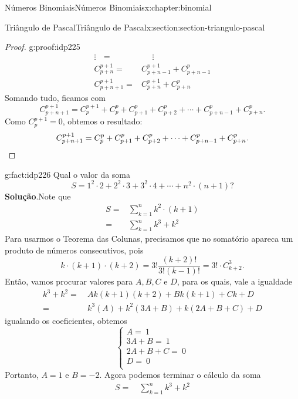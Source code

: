 \documentclass[oneside,10pt,]{book}
\newcommand{\blocktitlefont}{\relax}
\newcommand{\qedhere}{\relax}
\numberwithin{equation}{section}
\newcommand{\amp}{&}
\begin{document}
\begin{chapterptx}{Números Binomiais}{}{Números Binomiais}{}{}{x:chapter:binomial}
\begin{sectionptx}{Triângulo de Pascal}{}{Triângulo de Pascal}{}{}{x:section:section-triangulo-pascal}
\begin{proof}{}{g:proof:idp225}
\begin{align*}
\vdots ~~~ = \amp ~~~~~~ \vdots   \\
C_{p+n}^{p+1} = \amp C_{p+n-1}^{p+1} + C_{p+n-1}^p  \\
C_{p+n+1}^{p+1} = \amp C_{p+n}^{p+1} + C_{p+n}^p  
\end{align*}
Somando tudo, ficamos com%
\begin{equation*}
C_{p+n+1}^{p+1} = C_p^{p+1} + C_p^p + C_{p+1}^p + C_{p+2}^p +\cdots + C_{p+n-1}^p + C_{p+n}^p.
\end{equation*}
Como \(C_p^{p+1} = 0\), obtemos o resultado:%
\begin{equation*}
C_{p+n+1}^{p+1} = C_p^p + C_{p+1}^p + C_{p+2}^p +\cdots + C_{p+n-1}^p + C_{p+n}^p.\qedhere
\end{equation*}
\end{proof}
\begin{fact}{}{}{g:fact:idp226}%
Qual o valor da soma%
\begin{equation*}
S = 1^2\cdot2 + 2^2\cdot3+  3^2\cdot4+\cdots+n^2\cdot(n+1)? 
\end{equation*}
%
\textbf{\blocktitlefont Solução}.\quad{}Note que%
\begin{align*}
S = \amp \sum_{k=1}^{n} k^2\cdot (k+1)  \\
= \amp \sum_{k=1}^{n} k^3+k^2  
\end{align*}
Para usarmos o Teorema das Colunas, precisamos que no somatório apareca um produto de números consecutivos, pois%
\begin{equation*}
k\cdot(k+1)\cdot(k+2) = 3!\frac{(k+2)!}{3!(k-1)!} = 3!\cdot C_{k+2}^{3}.
\end{equation*}
Então, vamos procurar valores para \(A, B, C\) e \(D\), para os quais, vale a igualdade%
\begin{align*}
k^3+k^2 = \amp ~ Ak(k+1)(k+2) + Bk(k+1) + Ck +D  \\
= \amp ~ k^3(A) + k^2(3A+B) + k(2A+B+C) +D  
\end{align*}
igualando os coeficientes, obtemos%
\begin{equation*}
\begin{cases} 
A = ~ 1 \\
3A+B  = ~ 1 \\
2A+B+C  = ~ 0 \\
D = ~ 0 \\
\end{cases}
\end{equation*}
Portanto,  \(A= 1\) e  \(B = -2\). Agora podemos terminar o cálculo da soma%
\begin{align*}
S = \amp ~ \sum_{k=1}^{n} k^3+k^2  \\

\end{align*}
\end{fact}
\end{sectionptx}
\end{chapterptx}
\end{document}
